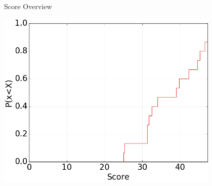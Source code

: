 \documentclass[t]{beamer}
\begin{document}
\begin{frame}[c,fragile]{Score Overview}

\centering
\includegraphics[width=0.8\textwidth]{scores_cdf.png}

\end{frame}
\end{document}
